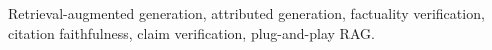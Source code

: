 \documentclass[lettersize,journal]{IEEEtran}
\begin{document}
\begin{IEEEkeywords}
Retrieval-augmented generation, attributed generation, factuality verification, citation faithfulness, claim verification, plug-and-play RAG.
\end{IEEEkeywords}


















 








\end{document}
